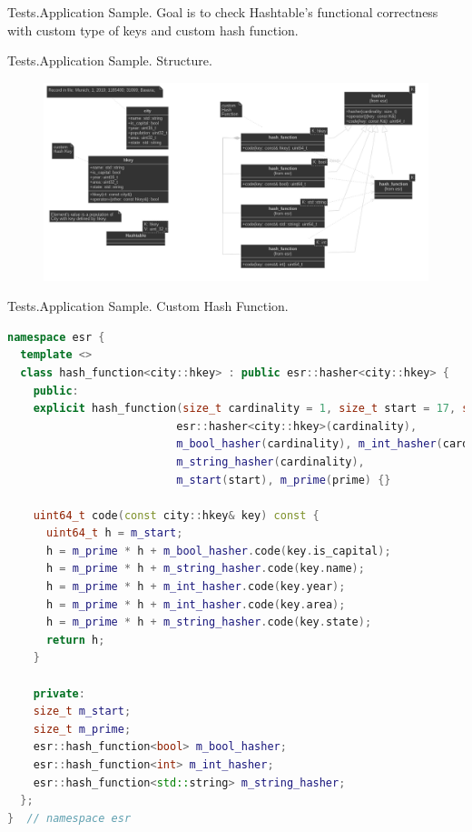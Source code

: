 \documentclass{beamer}
\begin{document}
\begin{frame}{Tests.}{Application Sample.}
  Goal is to check Hashtable's functional correctness with custom type of keys and custom hash function.   
\end{frame}

\begin{frame}{Tests.}{Application Sample. Structure.}
  \begin{figure}
    \includegraphics[scale=0.3]{structure_city_classes}
  \end{figure}
\end{frame}

\begin{frame}[fragile]{Tests.}{Application Sample. Custom Hash Function.}
\begin{lstlisting}[language=C++,basicstyle=\ttfamily\tiny,keywordstyle=\color{red}]
namespace esr {
  template <>
  class hash_function<city::hkey> : public esr::hasher<city::hkey> {
    public:
    explicit hash_function(size_t cardinality = 1, size_t start = 17, size_t prime = 31) :
                          esr::hasher<city::hkey>(cardinality),
                          m_bool_hasher(cardinality), m_int_hasher(cardinality),
                          m_string_hasher(cardinality),
                          m_start(start), m_prime(prime) {}

    uint64_t code(const city::hkey& key) const {
      uint64_t h = m_start;
      h = m_prime * h + m_bool_hasher.code(key.is_capital);
      h = m_prime * h + m_string_hasher.code(key.name);
      h = m_prime * h + m_int_hasher.code(key.year);
      h = m_prime * h + m_int_hasher.code(key.area);
      h = m_prime * h + m_string_hasher.code(key.state);
      return h;
    }

    private:
    size_t m_start;
    size_t m_prime;
    esr::hash_function<bool> m_bool_hasher;
    esr::hash_function<int> m_int_hasher;
    esr::hash_function<std::string> m_string_hasher;
  };
}  // namespace esr
\end{lstlisting}

\end{frame}
\end{document}
